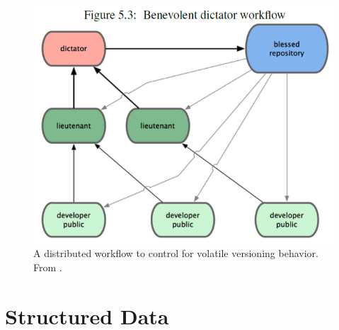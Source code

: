 \begin{figure}
	\centering
	\includegraphics[scale=0.85]{figures/federatedGit.png}
	\caption[A distributed workflow to control for volatile versioning behavior.]{A distributed workflow to control for volatile versioning behavior.  From  \cite{cederqvist2002version}.}
	\label{fig:federated}
\end{figure}

\section{Structured Data}

